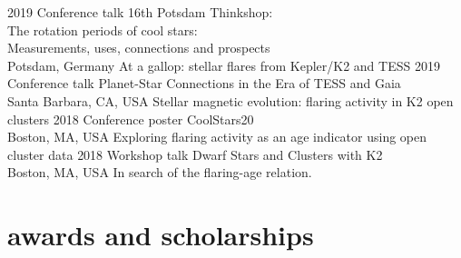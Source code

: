 \documentclass[]{k-cv} %
\begin{document}
\begin{entrylist}
\entry
{2019}
{Conference talk}
{16th Potsdam Thinkshop: \vspace{-.1cm}\\\null\hfill
The rotation periods of cool stars:\vspace{-.1cm}\\\null\hfill Measurements, uses, connections and prospects \vspace{-.1cm}\\\null\hfill
Potsdam, Germany}
{At a gallop: stellar flares from Kepler/K2 and TESS}
\entry
{2019}
{Conference talk}
{Planet-Star Connections in the Era of TESS and Gaia\vspace{-.1cm}\\\null\hfill Santa Barbara, CA, USA}
{Stellar magnetic evolution: flaring activity in K2 open clusters}
\entry
{2018}
{Conference poster}
{CoolStars20\vspace{-.1cm}\\\null\hfill Boston, MA, USA}
{Exploring flaring activity as an age indicator using open cluster data}
\entry
{2018}
{Workshop talk}
{Dwarf Stars and Clusters with K2\vspace{-.1cm}\\\null\hfill Boston, MA, USA}
{In search of the flaring-age relation.}
\end{entrylist}


%

\section{awards and scholarships}
\end{document}
